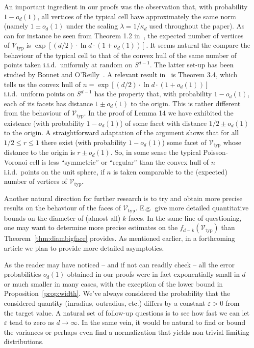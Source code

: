\documentclass[11pt]{article}%
\newcommand{\Vcal}[0]{\ensuremath{{\mathcal V}}}
\newcommand{\eps}{\varepsilon}
\newcommand{\Vtyp}[0]{\Vcal_{\text{typ}}}
\begin{document}
An important ingredient in our proofs was the observation that, with probability $1-o_d(1)$, all 
vertices of the typical cell have approximately the same norm (namely $1\pm o_d(1)$ under the scaling $\lambda = 1/\kappa_d$
used throughout the paper).
As can for instance be seen from Theorem 1.2 in~\cite{HoermannEtal}, the expected number of 
vertices of $\Vtyp$ is $\exp[ (d/2) \cdot \ln d \cdot (1+o_d(1)) ]$.
It seems natural the compare the behaviour of the typical cell to that of the convex hull of the same number 
of points taken i.i.d.~uniformly at random on $S^{d-1}$.
The latter set-up has been studied by Bonnet and O'Reilly~\cite{BonnetOReilly}. A relevant result in~\cite{BonnetOReilly} 
is Theorem 3.4, which tells us the convex hull of $n=\exp[ (d/2) \cdot \ln d \cdot (1+o_d(1)) ]$
i.i.d.~uniform points on $S^{d-1}$ has the property that, with probability $1-o_d(1)$, each of its facets has 
distance $1\pm o_d(1)$ to the origin.
This is rather different from the behaviour of $\Vtyp$. In the proof of Lemma 14 we have exhibited 
the existence (with probability $1-o_d(1)$) of some facet with distance $1/2\pm o_d(1)$ to the origin. 
A straightforward adaptation of the argument shows that for all $1/2\leq r\leq 1$ there exist 
(with probability $1-o_d(1)$) some facet of $\Vtyp$ whose distance to the origin is $r\pm o_d(1)$.
So, in some sense the typical Poisson-Voronoi cell is less ``symmetric'' or ``regular'' than the 
convex hull of $n$ i.i.d.~points on the unit sphere, if $n$ is taken comparable to the (expected) number of
vertices of $\Vtyp$.

Another natural direction for further research is to try and obtain more precise results on the behaviour of the 
faces of $\Vtyp$. E.g.~give more detailed quantitative bounds on the diameter of (almost all) $k$-faces.
In the same line of questioning, one may want to determine more precise estimates on the $f_{d-k}(\Vtyp)$ than 
Theorem~\ref{thm:diambigface} provides. As mentioned earlier, in a forthcoming article we plan to 
provide more detailed asymptotics.

As the reader may have noticed -- and if not can readily check -- all the error probabilities
$o_d(1)$ obtained in our proofs were in fact exponentially small in $d$ or much smaller in many cases, with 
the exception of the lower bound in Proposition~\ref{prop:width}.
We've always considered the probability that the considered quantity (inradius, outradius, etc.) differs
by a constant $\eps>0$ from the target value. A natural set of follow-up questions is to see 
how fast we can let $\eps$ tend to zero as $d\to\infty$. 
In the same vein, it would be natural to find or bound the variances or perhaps even find a normalization
that yields non-trivial limiting distributions.
\end{document}
